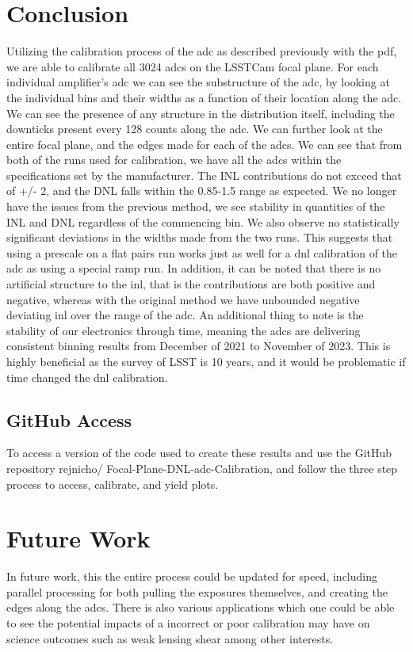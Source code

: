 \documentclass[11pt, letterpaper]{article}
\begin{document}
\section{Conclusion}
Utilizing the calibration process of the adc as described previously with the pdf, we are able to calibrate all 3024 adcs on the LSSTCam focal plane. For each individual amplifier’s adc we can see the substructure of the adc, by looking at the individual bins and their widths as a function of their location along the adc. We can see the presence of any structure in the distribution itself, including the downticks present every 128 counts along the adc. We can further look at the entire focal plane, and the edges made for each of the adcs. We can see that from both of the runs used for calibration, we have all the adcs within the specifications set by the manufacturer. The INL contributions do not exceed that of +/- 2, and the DNL falls within the 0.85-1.5 range as expected. We no longer have the issues from the previous method, we see stability in quantities of the INL and DNL regardless of the commencing bin. We also observe no statistically significant deviations in the widths made from the two runs. This suggests that using a prescale on a flat pairs run works just as well for a dnl calibration of the adc as using a special ramp run. In addition, it can be noted that there is no artificial structure to the inl, that is the contributions are both positive and negative, whereas with the original method we have unbounded negative deviating inl over the range of the adc. An additional thing to note is the stability of our electronics through time, meaning the adcs are delivering consistent binning results from December of 2021 to November of 2023. This is highly beneficial as the survey of LSST is 10 years, and it would be problematic if time changed the dnl calibration. 

\subsection{GitHub Access}
To access a version of the code used to create these results and use the GitHub repository rejnicho/
Focal-Plane-DNL-adc-Calibration, and follow the three step process to access, calibrate, and yield plots. 

\section{Future Work}
In future work, this the entire process could be updated for speed, including parallel processing for both pulling the exposures themselves, and creating the edges along the adcs. There is also various applications which one could be able to see the potential impacts of a incorrect or poor calibration may have on science outcomes such as weak lensing shear among other interests. 
\end{document}

